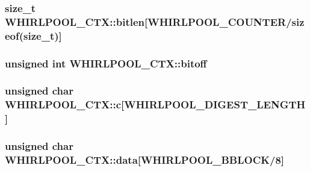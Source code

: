 \subsubsection[{\texorpdfstring{bitlen}{bitlen}}]{\setlength{\rightskip}{0pt plus 5cm}size\+\_\+t W\+H\+I\+R\+L\+P\+O\+O\+L\+\_\+\+C\+T\+X\+::bitlen\mbox{[}{\bf W\+H\+I\+R\+L\+P\+O\+O\+L\+\_\+\+C\+O\+U\+N\+T\+ER}/sizeof(size\+\_\+t)\mbox{]}}\hypertarget{struct_w_h_i_r_l_p_o_o_l___c_t_x_acdb67c455ec2f1ecd07e27e8419b03e0}{}\label{struct_w_h_i_r_l_p_o_o_l___c_t_x_acdb67c455ec2f1ecd07e27e8419b03e0}
\subsubsection[{\texorpdfstring{bitoff}{bitoff}}]{\setlength{\rightskip}{0pt plus 5cm}unsigned int W\+H\+I\+R\+L\+P\+O\+O\+L\+\_\+\+C\+T\+X\+::bitoff}\hypertarget{struct_w_h_i_r_l_p_o_o_l___c_t_x_a9af51a2a30f80139879b0f8a52ef08f0}{}\label{struct_w_h_i_r_l_p_o_o_l___c_t_x_a9af51a2a30f80139879b0f8a52ef08f0}
\subsubsection[{\texorpdfstring{c}{c}}]{\setlength{\rightskip}{0pt plus 5cm}unsigned char W\+H\+I\+R\+L\+P\+O\+O\+L\+\_\+\+C\+T\+X\+::c\mbox{[}{\bf W\+H\+I\+R\+L\+P\+O\+O\+L\+\_\+\+D\+I\+G\+E\+S\+T\+\_\+\+L\+E\+N\+G\+TH}\mbox{]}}\hypertarget{struct_w_h_i_r_l_p_o_o_l___c_t_x_ae95033cd5a461ce50604676672ad194d}{}\label{struct_w_h_i_r_l_p_o_o_l___c_t_x_ae95033cd5a461ce50604676672ad194d}
\subsubsection[{\texorpdfstring{data}{data}}]{\setlength{\rightskip}{0pt plus 5cm}unsigned char W\+H\+I\+R\+L\+P\+O\+O\+L\+\_\+\+C\+T\+X\+::data\mbox{[}{\bf W\+H\+I\+R\+L\+P\+O\+O\+L\+\_\+\+B\+B\+L\+O\+CK}/8\mbox{]}}\hypertarget{struct_w_h_i_r_l_p_o_o_l___c_t_x_ab580a848108e15b30239c9374c53caa7}{}\label{struct_w_h_i_r_l_p_o_o_l___c_t_x_ab580a848108e15b30239c9374c53caa7}

